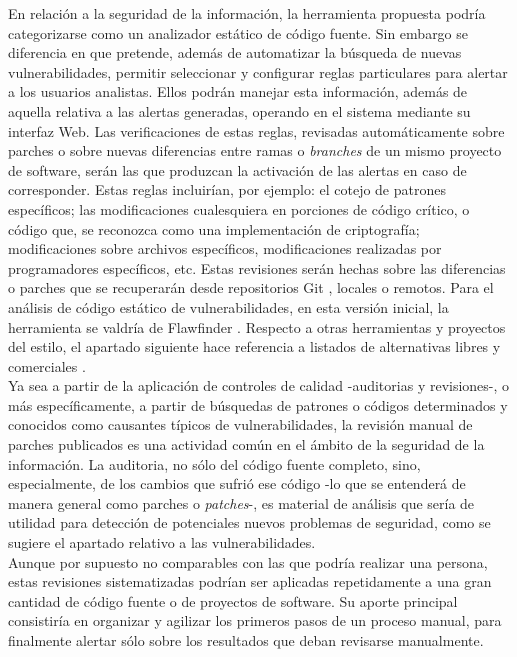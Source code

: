 \documentclass[11pt,a4paper]{article}
\begin{document}
En relación a la seguridad de la información, la herramienta propuesta podría categorizarse como un analizador estático de código fuente. Sin embargo se diferencia en que pretende, además de automatizar la búsqueda de nuevas vulnerabilidades, permitir seleccionar y configurar reglas particulares para alertar a los usuarios analistas. Ellos podrán manejar esta información, además de aquella relativa a las alertas generadas, operando en el sistema mediante su interfaz Web. Las verificaciones de estas reglas, revisadas automáticamente sobre parches o sobre nuevas diferencias entre ramas o \textit{branches} de un mismo proyecto de software, serán las que produzcan la activación de las alertas en caso de corresponder. Estas reglas incluirían, por ejemplo: el cotejo de patrones específicos; las modificaciones cualesquiera en porciones de código crítico, o código que, se reconozca como una implementación de criptografía; modificaciones sobre archivos específicos, modificaciones realizadas por programadores específicos, etc. Estas revisiones serán hechas sobre las diferencias o parches que se recuperarán desde repositorios Git \cite{Git}, locales o remotos. Para el análisis de código estático de vulnerabilidades, en esta versión inicial, la herramienta se valdría de Flawfinder \cite{Flawfinder}. Respecto a otras herramientas y proyectos del estilo, el apartado siguiente hace referencia a listados de alternativas libres y comerciales \cite{sei2, nist2, owa1}.
\\

Ya sea a partir de la aplicación de controles de calidad -auditorias y revisiones-, o más específicamente, a partir de búsquedas de patrones o códigos determinados y conocidos como causantes típicos de vulnerabilidades, la revisión manual de parches publicados es una actividad común en el ámbito de la seguridad de la información. La auditoria, no sólo del código fuente completo, sino, especialmente, de los cambios que sufrió ese código -lo que se entenderá de manera general como parches o \textit{patches}-, es material de análisis que sería de utilidad para detección de potenciales nuevos problemas de seguridad, como se sugiere el apartado relativo a las vulnerabilidades.
\\

Aunque por supuesto no comparables con las que podría realizar una persona, estas revisiones sistematizadas podrían ser aplicadas repetidamente a una gran cantidad de código fuente o de proyectos de software. Su aporte principal consistiría en organizar y agilizar los primeros pasos de un proceso manual, para finalmente alertar sólo sobre los resultados que deban revisarse manualmente.
\\
\end{document}
